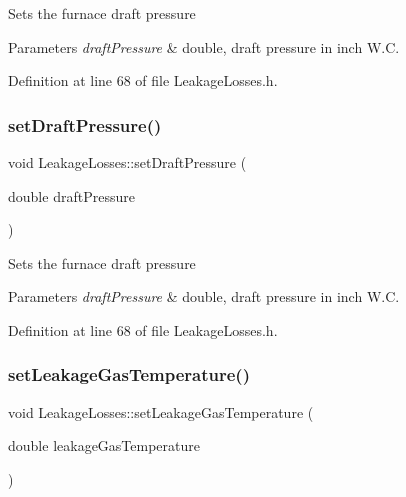 Sets the furnace draft pressure 
\begin{DoxyParams}{Parameters}
{\em draft\+Pressure} & double, draft pressure in inch W.\+C. \\
\hline
\end{DoxyParams}


Definition at line 68 of file Leakage\+Losses.\+h.

\mbox{\label{class_leakage_losses_a33f31dc336fc6af0fd1e8c8739f37b1a}} 
\subsubsection{\texorpdfstring{set\+Draft\+Pressure()}{setDraftPressure()}\hspace{0.1cm}{\footnotesize\ttfamily [3/3]}}
{\footnotesize\ttfamily void Leakage\+Losses\+::set\+Draft\+Pressure (\begin{DoxyParamCaption}\item[{double}]{draft\+Pressure }\end{DoxyParamCaption})\hspace{0.3cm}{\ttfamily [inline]}}

Sets the furnace draft pressure 
\begin{DoxyParams}{Parameters}
{\em draft\+Pressure} & double, draft pressure in inch W.\+C. \\
\hline
\end{DoxyParams}


Definition at line 68 of file Leakage\+Losses.\+h.

\mbox{\label{class_leakage_losses_a379c88c8dea822636a1b9966e2408daa}} 
\subsubsection{\texorpdfstring{set\+Leakage\+Gas\+Temperature()}{setLeakageGasTemperature()}\hspace{0.1cm}{\footnotesize\ttfamily [1/3]}}
{\footnotesize\ttfamily void Leakage\+Losses\+::set\+Leakage\+Gas\+Temperature (\begin{DoxyParamCaption}\item[{double}]{leakage\+Gas\+Temperature }\end{DoxyParamCaption})\hspace{0.3cm}{\ttfamily [inline]}}

